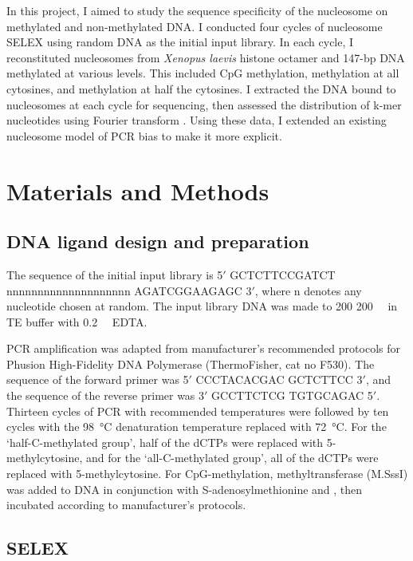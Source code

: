 \documentclass[parskip=full, numbers=noenddot]{scrreprt}
\begin{document}
In this project, I aimed to study the sequence specificity of the nucleosome on methylated and non-methylated DNA.  I conducted four cycles of nucleosome SELEX using random DNA as the initial input library.  In each cycle, I reconstituted nucleosomes from \emph{Xenopus laevis} histone octamer and 147-bp DNA \citep{dyer_reconstitution_2003} methylated at various levels.  This included CpG methylation, methylation at all cytosines, and methylation at half the cytosines.  I extracted the DNA bound to nucleosomes at each cycle for sequencing, then assessed the distribution of k-mer nucleotides using Fourier transform \citep{lowary_new_1998, zhu_interaction_2018}.  Using these data, I extended an existing nucleosome model of PCR bias to make it more explicit.

\section{Materials and Methods}
\label{sec:emsaselex_methods}

\subsection{DNA ligand design and preparation}
\label{ssec:emsaselex_methods_lig}

The sequence of the initial input library is 5$'$ GCTCTTCCGATCT nnnnnnnnnnnnnnnnnnnn AGATCGGAAGAGC 3$'$, where n denotes any nucleotide chosen at random. The input library DNA was made to 200 \SI{200}{\nano\Molar} in TE buffer with \SI{0.2}{\milli\Molar} EDTA.

PCR amplification was adapted from manufacturer's recommended protocols for Phusion High-Fidelity DNA Polymerase (ThermoFisher, cat no F530).  The sequence of the forward primer was 5$'$ CCCTACACGAC GCTCTTCC 3$'$, and the sequence of the reverse primer was 3$'$ GCCTTCTCG TGTGCAGAC 5$'$.  Thirteen cycles of PCR with recommended temperatures were followed by ten cycles with the \SI{98}{\celsius} denaturation temperature replaced with \SI{72}{\celsius}.  For the `half-C-methylated group', half of the dCTPs were replaced with 5-methylcytosine, and for the `all-C-methylated group', all of the dCTPs were replaced with 5-methylcytosine.   For CpG-methylation, methyltransferase (M.SssI) was added to DNA in conjunction with S-adenosylmethionine and , then incubated according to manufacturer's protocols.

\subsection{SELEX}
\label{ssec:emsaselex_methods_selex}
\end{document}
